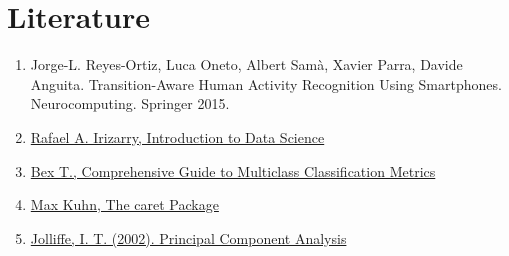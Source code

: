 \documentclass[
]{article}
\providecommand{\tightlist}{%
  \setlength{\itemsep}{0pt}\setlength{\parskip}{0pt}}
\begin{document}
\hypertarget{literature}{%
\section{Literature}\label{literature}}

\begin{enumerate}
\def\labelenumi{\arabic{enumi}.}
\tightlist
\item
  Jorge-L. Reyes-Ortiz, Luca Oneto, Albert Samà, Xavier Parra, Davide
  Anguita. Transition-Aware Human Activity Recognition Using
  Smartphones. Neurocomputing. Springer 2015.
\item
  \href{https://rafalab.github.io/dsbook/}{Rafael A. Irizarry,
  Introduction to Data Science}
\item
  \href{https://towardsdatascience.com/comprehensive-guide-on-multiclass-classification-metrics-af94cfb83fbd}{Bex
  T., Comprehensive Guide to Multiclass Classification Metrics}
\item
  \href{https://topepo.github.io/caret/}{Max Kuhn, The caret Package}
\item
  \href{https://link.springer.com/book/10.1007\%2Fb98835}{Jolliffe, I.
  T. (2002). Principal Component Analysis}
\end{enumerate}
\end{document}
